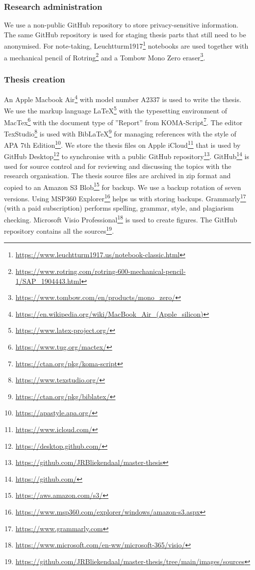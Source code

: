 \subsubsection{Research administration}
\label{sub:tbresearchadministration}
We use a non-public GitHub repository to store privacy-sensitive information. The same GitHub repository is used for staging thesis parts that still need to be anonymised. For note-taking, Leuchtturm1917\footnote{\url{https://www.leuchtturm1917.us/notebook-classic.html}} notebooks are used together with a mechanical pencil of Rotring\footnote{\url{https://www.rotring.com/rotring-600-mechanical-pencil-1/SAP_1904443.html}} and a Tombow Mono Zero eraser\footnote{\url{https://www.tombow.com/en/products/mono_zero/}}.
\subsubsection{Thesis creation}
\label{subsub:tbresearchcreation}
An Apple Macbook Air\footnote{\url{https://en.wikipedia.org/wiki/MacBook_Air_(Apple_silicon)}} with model number A2337 is used to write the thesis. We use the markup language \LaTeX\footnote{\url{https://www.latex-project.org/}} with the typesetting environment of MacTex\footnote{\url{https://www.tug.org/mactex/}} with the document type of ''Report'' from KOMA-Script\footnote{\url{https://ctan.org/pkg/koma-script}}. The editor TexStudio\footnote{\url{https://www.texstudio.org/}} is used with Bib\LaTeX\footnote{\url{https://ctan.org/pkg/biblatex/}} for managing references with the style of APA 7th Edition\footnote{\url{https://apastyle.apa.org/}}. We store the thesis files on Apple iCloud\footnote{\url{https://www.icloud.com/}} that is used by GitHub Desktop\footnote{\url{https://desktop.github.com/}} to synchronise with a public GitHub repository\footnote{\url{https://github.com/JRBliekendaal/master-thesis}}. GitHub\footnote{\url{https://github.com/}}  is used for source control and for reviewing and discussing the topics with the research organisation. The thesis source files are archived in zip format and copied to an Amazon S3 Blob\footnote{\url{https://aws.amazon.com/s3/}} for backup. We use a backup rotation of seven versions. Using MSP360 Explorer\footnote{\url{https://www.msp360.com/explorer/windows/amazon-s3.aspx}} helps us with storing backups. Grammarly\footnote{\url{https://www.grammarly.com}} (with a paid subscription) performs spelling, grammar, style, and plagiarism checking. Microsoft Visio Professional\footnote{\url{https://www.microsoft.com/en-ww/microsoft-365/visio/}} is used to create figures. The GitHub repository contains all the sources\footnote{\url{https://github.com/JRBliekendaal/master-thesis/tree/main/images/sources}}.